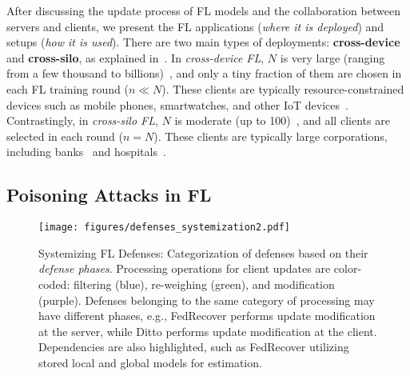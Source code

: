 After discussing the update process of FL models and the collaboration between servers and clients, we present the FL applications (\emph{where it is deployed}) and setups (\emph{how it is used}). There are two main types of deployments: \textbf{cross-device} and \textbf{cross-silo}, as explained in~\cite{kairouz2019advances}.
In \emph{cross-device FL}, $N$ is very large (ranging from a few thousand to billions)~\cite{reddi2020adaptive}, and only a tiny fraction of them are chosen in each FL training round ($n\ll N$). These clients are typically resource-constrained devices such as mobile phones, smartwatches, and other IoT devices~\cite{gboard, zhao2022multimodal}. Contrastingly, in \emph{cross-silo FL}, $N$ is moderate (up to 100)~\cite{li2021model}, and all clients are selected in each round ($n=N$). These clients are typically large corporations, including banks~\cite{webankcredit} and hospitals~\cite{nguyen2022federated}.
\subsection{Poisoning Attacks in FL}\label{background:attacks}
\begin{figure}[t]
\centering
\texttt{[image: figures/defenses\_systemization2.pdf]}
\caption{Systemizing FL Defenses: Categorization of defenses based on their \emph{defense phases}. Processing operations for client updates are color-coded: filtering (blue), re-weighing (green), and modification (purple). Defenses belonging to the same category of processing may have different phases, e.g., FedRecover performs update modification at the server, while Ditto performs update modification at the client. Dependencies are also highlighted, such as FedRecover utilizing stored local and global models for estimation.}
\label{fig:defenses_systemization}
\end{figure}

